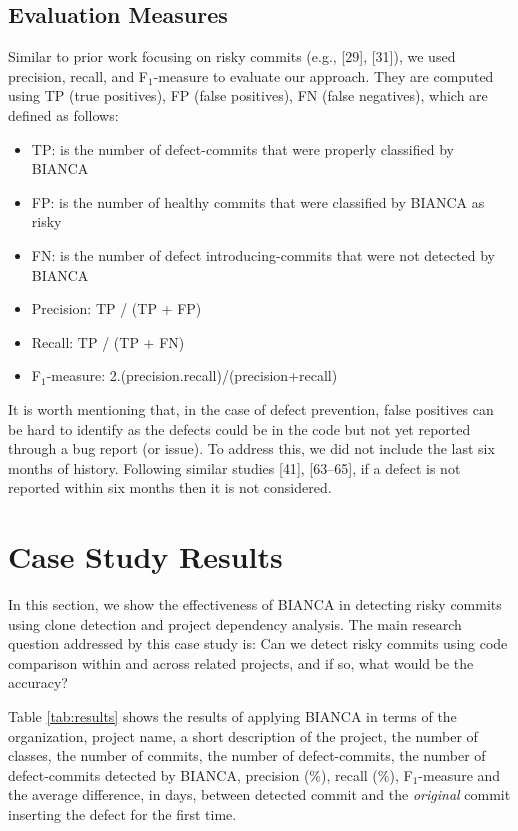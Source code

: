 \documentclass[conference]{IEEEtran}
\begin{document}
\subsection{Evaluation Measures}\label{evaluation-measures}

Similar to prior work focusing on risky commits (e.g., {[}29{]},
{[}31{]}), we used precision, recall, and F$_1$-measure to evaluate our
approach. They are computed using TP (true positives), FP (false
positives), FN (false negatives), which are defined as follows:

\begin{itemize}
\itemsep1pt\parskip0pt
\item
  TP: is the number of defect-commits that were properly classified by
  BIANCA
\item
  FP: is the number of healthy commits that were classified by BIANCA as
  risky
\item
  FN: is the number of defect introducing-commits that were not detected
  by BIANCA
\item
  Precision: TP / (TP + FP)
\item
  Recall: TP / (TP + FN)
\item
  F$_1$-measure: 2.(precision.recall)/(precision+recall)
\end{itemize}

It is worth mentioning that, in the case of defect prevention, false
positives can be hard to identify as the defects could be in the code
but not yet reported through a bug report (or issue). To address this,
we did not include the last six months of history. Following similar
studies {[}41{]}, {[}63--65{]}, if a defect is not reported within six
months then it is not considered.

\section{Case Study Results}\label{sec:result}

In this section, we show the effectiveness of BIANCA in detecting risky
commits using clone detection and project dependency analysis. The main
research question addressed by this case study is: Can we detect risky
commits using code comparison within and across related projects, and if
so, what would be the accuracy?



Table \ref{tab:results} shows the results of applying BIANCA in terms of
the organization, project name, a short description of the project, the
number of classes, the number of commits, the number of defect-commits,
the number of defect-commits detected by BIANCA, precision (\%), recall
(\%), F$_1$-measure and the average difference, in days, between
detected commit and the \emph{original} commit inserting the defect for
the first time.
\end{document}
